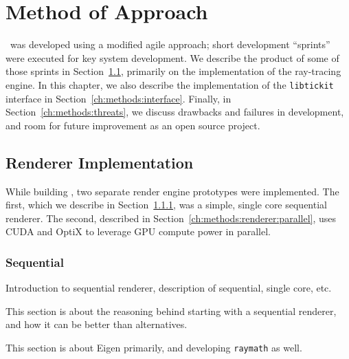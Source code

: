 %
%
%
\chapter{Method of Approach} \label{ch:methods}

\name\ was developed using a modified agile approach; short development ``sprints'' were executed for key system development.
We describe the product of some of those sprints in Section~\ref{ch:methods:renderer}, primarily on the implementation of the ray-tracing engine.
In this chapter, we also describe the implementation of the \texttt{libtickit} interface in Section~\ref{ch:methods:interface}.
Finally, in Section~\ref{ch:methods:threats}, we discuss drawbacks and failures in development, and room for future improvement as an open source project.


\section{Renderer Implementation} \label{ch:methods:renderer}
While building \name, two separate render engine prototypes were implemented.
The first, which we describe in Section~\ref{ch:methods:renderer:sequential}, was a simple, single core sequential renderer.
The second, described in Section~\ref{ch:methods:renderer:parallel}, uses CUDA \cite{nvidia2011cuda} and OptiX \cite{parker2010optix} to leverage GPU compute power in parallel.


\subsection{Sequential} \label{ch:methods:renderer:sequential}

Introduction to sequential renderer, description of sequential, single core, etc.

 \label{ch:methods:renderer:sequential:motivation}

This section is about the reasoning behind starting with a sequential renderer, and how it can be better than alternatives.

 \label{ch:methods:renderer:sequential:libraries}

This section is about Eigen primarily, and developing \texttt{raymath} as well.

